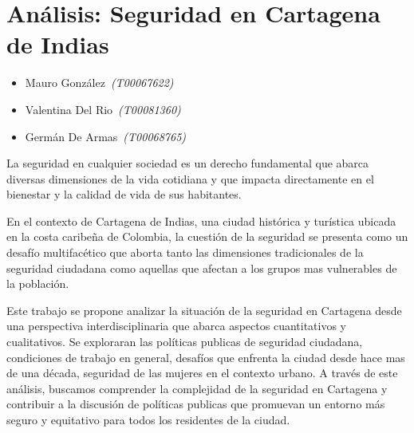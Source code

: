 \documentclass[letterpaper, 12pt]{article}
\begin{document}
\section*{Análisis: Seguridad en Cartagena de Indias}

\noindent\makebox[\linewidth]{\rule{\textwidth}{0.4pt}}

\begin{itemize}[label=$\diamond$]
    \item Mauro González~\textit{(T00067622)}
    \item Valentina Del Rio~\textit{(T00081360)}
    \item Germán De Armas~\textit{(T00068765)}
\end{itemize}

\noindent\makebox[\linewidth]{\rule{\textwidth}{0.4pt}}

\nocite{fontalvo_leyes2019}
\nocite{correa_ramirez2021}
\nocite{alvis_arrieta2011}
\nocite{castillo_avila2013}
\nocite{villa_moncaris2020}
\nocite{gomez_bustamante2019}
\nocite{montoya_ruiz2013}


\nocite{Comunicaciones_2023}
\nocite{Observatorio_2023}
\nocite{MedicinaLegalCienciasForenses_2023}



% 

La seguridad en cualquier sociedad es un derecho
fundamental que abarca diversas dimensiones de la vida
cotidiana y que impacta directamente en el bienestar y la
calidad de vida de sus habitantes.

En el contexto de Cartagena de Indias, una ciudad histórica
y turística ubicada en la costa caribeña de Colombia, la
cuestión de la seguridad se presenta como un desafío
multifacético que aborta tanto las dimensiones
tradicionales de la seguridad ciudadana como aquellas que
afectan a los grupos mas vulnerables de la población.

Este trabajo se propone analizar la situación de la
seguridad en Cartagena desde una perspectiva
interdisciplinaria que abarca aspectos cuantitativos y
cualitativos. Se exploraran las políticas publicas de
seguridad ciudadana, condiciones de trabajo en general,
desafíos que enfrenta la ciudad desde hace mas de una
década, seguridad de las mujeres en el contexto urbano. A
través de este análisis, buscamos comprender la complejidad
de la seguridad en Cartagena y contribuir a la discusión de
políticas publicas que promuevan un entorno más seguro y
equitativo para todos los residentes de la ciudad.
\end{document}
